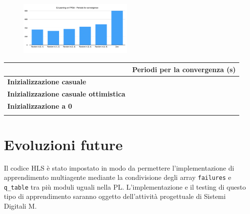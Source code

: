 \documentclass{article}
\begin{document}
\begin{figure}[h!]

\centering


\includegraphics[width=0.5\textwidth]{perf.png}
\label{fig:perf}
\end{figure}

\begin{table}[h!]

\centering


\begin{tabular}{|
	>{\columncolor[HTML]{EFEFEF}}l |l|}
	\hline
	& \cellcolor[HTML]{EFEFEF}\textbf{Periodi per la convergenza (s)} \\ \hline
	\textbf{Inizializzazione casuale}             &                                                                 \\ \hline
	\textbf{Inizializzazione casuale ottimistica} &                                                                 \\ \hline
	\textbf{Inizializzazione a 0}                 &                                                                 \\ \hline
	\textbf{}                                     &                                                                 \\ \hline
	\end{tabular}
	\label{table:perf}
	\end{table}
	\section{Evoluzioni future}
	Il codice HLS è stato impostato in modo da permettere l'implementazione di apprendimento multiagente \citep{kretchmar_parallel_2002} mediante la condivisione degli array \texttt{failures} e \texttt{q\_table} tra più moduli uguali nella PL.
	L'implementazione e il testing di questo tipo di apprendimento saranno oggetto dell'attività progettuale di Sistemi Digitali M.
	
	\nocite{*}
	
	
\end{document}
